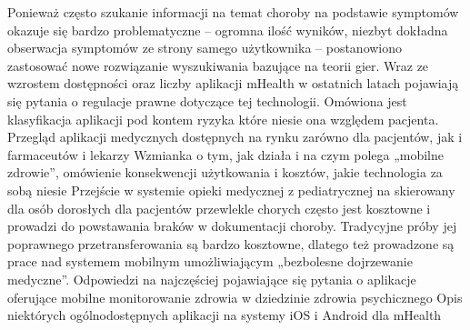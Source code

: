 \cite{CoIaKMEklund2013Onchallengeswithmobilee-health:lessonsfromagame-theoreticperspectivegametheoryhealthinformaticsinformationretrieval} Ponieważ często szukanie informacji na temat choroby na podstawie symptomów okazuje się bardzo problematyczne – ogromna ilość wyników, niezbyt dokładna obserwacja symptomów ze strony samego użytkownika – postanowiono zastosować nowe rozwiązanie wyszukiwania bazujące na teorii gier.
\cite{HdmWetzel2012MobilehealthisintheregulatorycrosshairsHealthadministrationComputersHandheldUnitedStatesFoodandDrugAdministrationDeliveryofHealthCareUnitedStatesInformationStorageandRetrievalGovernmentRegulation} Wraz ze wzrostem dostępności oraz liczby aplikacji mHealth w ostatnich latach pojawiają się pytania o regulacje prawne dotyczące tej technologii. Omówiona jest klasyfikacja aplikacji pod kontem ryzyka które niesie ona względem pacjenta.
\cite{DTPeyton2013MobileappsformanaginghealthUnitedStates--USPatientcareplanningTechnologyadoptionPharmacistsSoftwareutilities} Przegląd aplikacji medycznych dostępnych na rynku zarówno dla pacjentów, jak i farmaceutów i lekarzy
\cite{OHTyler2014MobilehealthmonitorsUnitedKingdom--UKSmartphonesTelemedicineQualityofcareOccupationalhealth} Wzmianka o tym, jak działa i na czym polega „mobilne zdrowie”, omówienie konsekwencji użytkowania i kosztów, jakie technologia za sobą niesie
\cite{CoHFiCSPeyton2013MyMobileHealthMyMobileLife:methodsfordesigninghealthinterventionswithadolescentsHuman-centeredcomputingactionresearchadolescents&youthmobilehealthparticipatorydesignvulnerablepopulations} Przejście w systemie opieki medycznej z pediatrycznej na skierowany dla osób dorosłych dla pacjentów przewlekle chorych często jest kosztowne i prowadzi do powstawania braków w dokumentacji choroby. Tradycyjne próby jej poprawnego przetransferowania są bardzo kosztowne, dlatego też prowadzone są prace nad systemem mobilnym umożliwiającym „bezbolesne dojrzewanie medyczne”.
\cite{JoPNHSElias2014MobileAppsforPsychiatricNursesPsychiatric-mentalhealthnursingSmartphonesHandheldcomputersSoftware} Odpowiedzi na najczęściej pojawiające się pytania o aplikacje oferujące mobilne monitorowanie zdrowia w dziedzinie zdrowia psychicznego
\cite{OHPhillips2014Appsforhealthprofessionals} Opis niektórych ogólnodostępnych aplikacji na systemy iOS i Android dla mHealth